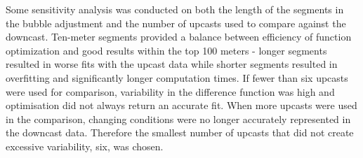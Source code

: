 \documentclass[
	a4paper, %
	10pt, %
	unnumberedsections, %
	twoside, %
]{LTJournalArticle}
\begin{document}
\begin{multicols}{2}
Some sensitivity analysis was conducted on both the length of the segments in the bubble adjustment and the number
of upcasts used to compare against the downcast. Ten-meter segments provided a balance between efficiency of function
optimization and good results within the top 100 meters - longer segments resulted in worse fits with the upcast data
while shorter segments resulted in overfitting and significantly longer computation times. If fewer than six upcasts
were used for comparison, variability in the difference function was high and optimisation did not always return an
accurate fit. When more upcasts were used in the comparison, changing conditions were no longer accurately represented
in the downcast data. Therefore the smallest number of upcasts that did not create excessive variability, six, was chosen.

\end{multicols}
\end{document}
